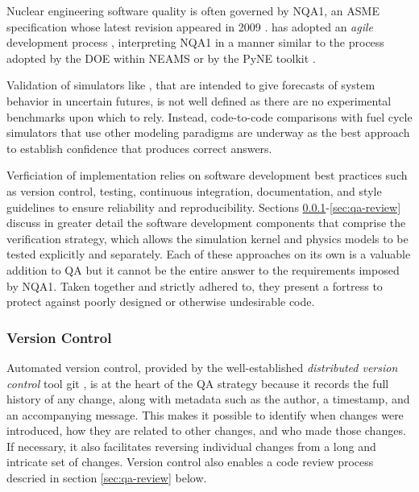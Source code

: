 Nuclear engineering software quality is often governed by \gls{NQA1}, an
\gls{ASME} specification whose latest revision appeared in 2009
\cite{asme_nqa-1a-2009_2009}.  \Cyclus has adopted an \emph{agile} development
process \cite{larman_agile_2004}, interpreting \gls{NQA1} in a manner similar
to the process adopted by the \gls{DOE} within \gls{NEAMS}
\cite{neams_nuclear_2013} or by the PyNE toolkit \cite{biondo_quality_2014}.

Validation of simulators like \Cyclus, that are intended to give forecasts of
system behavior in uncertain futures, is not well defined as there are no
experimental benchmarks upon which to rely.  Instead, code-to-code comparisons
with fuel cycle simulators that use other modeling paradigms are underway as
the best approach to establish confidence that \Cyclus produces correct
answers. \cite{huff_extensions_2014}

Verficiation of \Cyclus implementation relies on software development best
practices such as version control, testing, continuous integration,
documentation, and style guidelines to ensure reliability and
reproducibility. Sections \ref{sec:qa-vc}-\ref{sec:qa-review} discuss in
greater detail the software development components that comprise the \Cyclus
verification strategy, which allows the simulation kernel and physics models
to be tested explicitly and separately. Each of these approaches on its own is
a valuable addition to \gls{QA} but it cannot be the entire answer to the
requirements imposed by \gls{NQA1}. Taken together and strictly adhered to,
they present a fortress to protect against poorly designed or otherwise
undesirable code.

\subsubsection{Version Control}
\label{sec:qa-vc}

Automated version control, provided by the well-established \emph{distributed
  version control} tool git \cite{software_freedom_conservancy_git_2014}, is
at the heart of the QA strategy because it records the full history of any
change, along with metadata such as the author, a timestamp, and an
accompanying message. This makes it possible to identify when changes were
introduced, how they are related to other changes, and who made those changes.  If
necessary, it also facilitates reversing individual changes from a long and
intricate set of changes.  Version control also enables a code review process
descried in section \ref{sec:qa-review} below.

